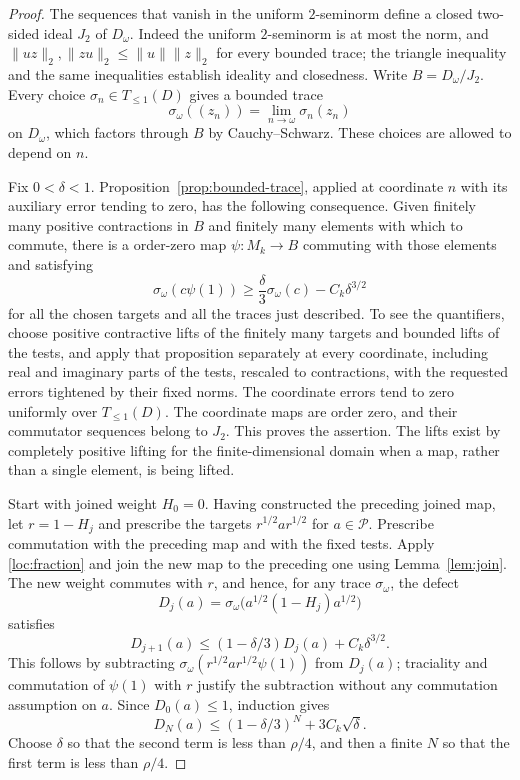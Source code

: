 \begin{proof}
The sequences that vanish in the uniform $2$-seminorm define a closed
two-sided ideal $J_2$ of $D_\omega$.  Indeed the uniform $2$-seminorm is
at most the norm, and
$\|uz\|_2,\|zu\|_2\le\|u\|\|z\|_2$ for every bounded trace; the
triangle inequality and the same inequalities establish ideality and
closedness.  Write $B=D_\omega/J_2$.  Every choice
$\sigma_n\in T_{\leq1}(D)$ gives a bounded trace
\[
 \sigma_\omega((z_n))=\lim_{n\to\omega}\sigma_n(z_n)
\]
on $D_\omega$, which factors through $B$ by Cauchy--Schwarz.  These
choices are allowed to depend on $n$.

Fix $0<\delta<1$.  Proposition~\ref{prop:bounded-trace}, applied at
coordinate $n$ with its auxiliary error tending to zero, has the
following consequence.  Given finitely many positive contractions in
$B$ and finitely many elements with which to commute, there is a
\cpc order-zero map $\psi:M_k\to B$ commuting with those elements and
satisfying
\begin{equation}\label{loc:fraction}
 \sigma_\omega(c\psi(1))
 \ge\frac{\delta}{3}\sigma_\omega(c)-C_k\delta^{3/2}
\end{equation}
for all the chosen targets and all the traces just described.
To see the quantifiers, choose positive contractive lifts of the
finitely many targets and bounded lifts of the tests, and apply that
proposition separately at every coordinate, including real and
imaginary parts of the tests, rescaled to contractions, with the
requested errors tightened by their fixed norms.  The coordinate errors tend to zero
uniformly over $T_{\leq1}(D)$.  The coordinate maps are order zero,
and their commutator sequences belong to $J_2$.  This proves the
assertion.  The lifts exist by completely positive lifting for the
finite-dimensional domain when a map, rather than a single element,
is being lifted.

Start with joined weight $H_0=0$.  Having constructed the preceding
joined map, let $r=1-H_j$ and prescribe the targets
$r^{1/2}ar^{1/2}$ for $a\in\mathcal P$.  Prescribe commutation with
the preceding map and with the fixed tests.  Apply
\eqref{loc:fraction} and join the new map to the preceding one using
Lemma~\ref{lem:join}.  The new weight commutes with $r$, and hence, for
any trace $\sigma_\omega$, the defect
\[
 D_j(a)=\sigma_\omega\bigl(a^{1/2}(1-H_j)a^{1/2}\bigr)
\]
satisfies
\[
 D_{j+1}(a)\le(1-\delta/3)D_j(a)+C_k\delta^{3/2}.
\]
This follows by subtracting
$\sigma_\omega(r^{1/2}ar^{1/2}\psi(1))$ from $D_j(a)$;
traciality and commutation of $\psi(1)$ with $r$ justify the subtraction
without any commutation assumption on $a$.  Since $D_0(a)\le1$, induction
gives
\begin{equation}\label{loc:geometric}
 D_N(a)\le(1-\delta/3)^N+3C_k\sqrt\delta.
\end{equation}
Choose $\delta$ so that the second term is less than $\rho/4$, and
then a finite $N$ so that the first term is less than $\rho/4$.


\end{proof}
